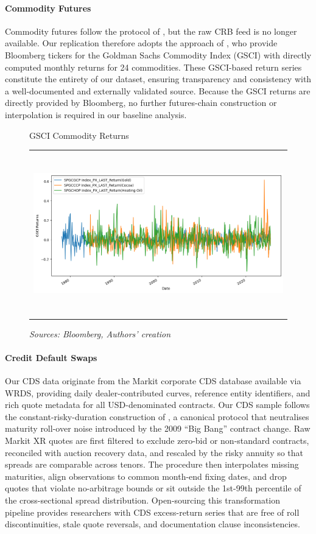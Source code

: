 \documentclass{article}
\begin{document}
\paragraph{Commodity Futures}
Commodity futures follow the protocol of \cite{Yang2013}, but the raw CRB feed
is no longer available. Our replication therefore adopts the approach of
\cite{Koijen2018}, who provide Bloomberg tickers for the Goldman Sachs
Commodity Index (GSCI) with directly computed monthly returns for 24 commodities.
These GSCI-based return series constitute the entirety of our dataset, ensuring
transparency and consistency with a well-documented and externally validated
source. Because the GSCI returns are directly provided by Bloomberg, no further
futures-chain construction or interpolation is required in our baseline analysis.


\begin{figure}[h!]
    \centering
    \caption{GSCI Commodity Returns}
  \begin{tabular}{@{}c@{}}
    \includegraphics[width=.7\linewidth,height=200pt,width=400pt]{../docs_src/commod_gsci_return.png}
  \end{tabular}
  \caption*{\emph{Sources: Bloomberg, Authors' creation}}
  \label{fig:gsci_commodity_returns}
\end{figure}

\paragraph{Credit Default Swaps}
Our CDS data originate from the Markit corporate CDS database available via
WRDS, providing daily dealer-contributed curves, reference entity identifiers,
and rich quote metadata for all USD-denominated contracts. 
Our CDS sample follows the constant-risky-duration construction of
\cite{Palhares2012}, a canonical protocol that neutralises maturity roll-over
noise introduced by the 2009 ``Big Bang'' contract change. Raw Markit XR quotes
are first filtered to exclude zero-bid or non-standard contracts, reconciled
with auction recovery data, and rescaled by the risky annuity so that spreads
are comparable across tenors.  The procedure then interpolates missing
maturities, align observations to common month-end fixing dates, and drop quotes
that violate no-arbitrage bounds or sit outside the 1st-99th percentile of the
cross-sectional spread distribution. Open-sourcing this transformation pipeline
provides researchers with CDS excess-return series that are free of roll
discontinuities, stale quote reversals, and documentation clause
inconsistencies.
\end{document}
